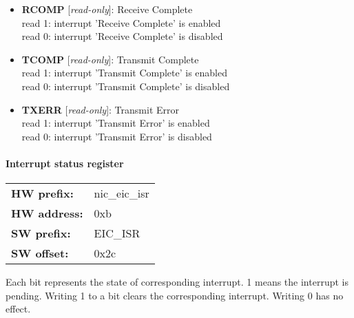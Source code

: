 \begin{itemize}
\item \begin{small}
{\bf 
RCOMP
} [\emph{read-only}]: Receive Complete
\\
read 1: interrupt 'Receive Complete' is enabled\\read 0: interrupt 'Receive Complete' is disabled
\end{small}
\item \begin{small}
{\bf 
TCOMP
} [\emph{read-only}]: Transmit Complete
\\
read 1: interrupt 'Transmit Complete' is enabled\\read 0: interrupt 'Transmit Complete' is disabled
\end{small}
\item \begin{small}
{\bf 
TXERR
} [\emph{read-only}]: Transmit Error
\\
read 1: interrupt 'Transmit Error' is enabled\\read 0: interrupt 'Transmit Error' is disabled
\end{small}
\end{itemize}
\paragraph*{Interrupt status register}\vspace{12pt}

\begin{tabular}{l l }
{\bf HW prefix:}  & nic\_eic\_isr\\
{\bf HW address:}  & 0xb\\
{\bf SW prefix:}  & EIC\_ISR\\
{\bf SW offset:}  & 0x2c\\
\end{tabular}

\vspace{12pt}
Each bit represents the state of corresponding interrupt. 1 means the interrupt is pending. Writing 1 to a bit clears the corresponding interrupt. Writing 0 has no effect.

